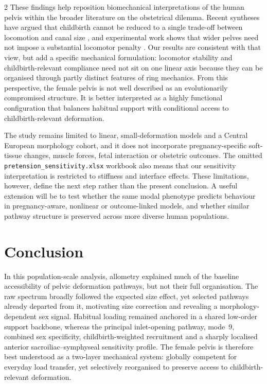 \documentclass[openacc]{rsproca_new}
\begin{document}
\begin{multicols}{2}
These findings help reposition biomechanical interpretations of the human pelvis within the broader literature on the obstetrical dilemma. Recent syntheses have argued that childbirth cannot be reduced to a single trade-off between locomotion and canal size \cite{Pavlicev2020,Haeusler2021,Grunstra2023}, and experimental work shows that wider pelves need not impose a substantial locomotor penalty \cite{Warrener2015}. Our results are consistent with that view, but add a specific mechanical formulation: locomotor stability and childbirth-relevant compliance need not sit on one linear axis because they can be organised through partly distinct features of ring mechanics. From this perspective, the female pelvis is not well described as an evolutionarily compromised structure. It is better interpreted as a highly functional configuration that balances habitual support with conditional access to childbirth-relevant deformation.

The study remains limited to linear, small-deformation models and a Central European morphology cohort, and it does not incorporate pregnancy-specific soft-tissue changes, muscle forces, fetal interaction or obstetric outcomes. The omitted \texttt{pretension\_sensitivity.xlsx} workbook also means that our sensitivity interpretation is restricted to stiffness and interface effects. These limitations, however, define the next step rather than the present conclusion. A useful extension will be to test whether the same modal phenotype predicts behaviour in pregnancy-aware, nonlinear or outcome-linked models, and whether similar pathway structure is preserved across more diverse human populations.
\section{Conclusion}

In this population-scale analysis, allometry explained much of the baseline accessibility of pelvic deformation pathways, but not their full organisation. The raw spectrum broadly followed the expected size effect, yet selected pathways already departed from it, motivating size correction and revealing a morphology-dependent sex signal. Habitual loading remained anchored in a shared low-order support backbone, whereas the principal inlet-opening pathway, mode~9, combined sex specificity, childbirth-weighted recruitment and a sharply localised anterior sacroiliac--symphyseal sensitivity profile. The female pelvis is therefore best understood as a two-layer mechanical system: globally competent for everyday load transfer, yet selectively reorganised to preserve access to childbirth-relevant deformation.


\end{multicols}
\end{document}
